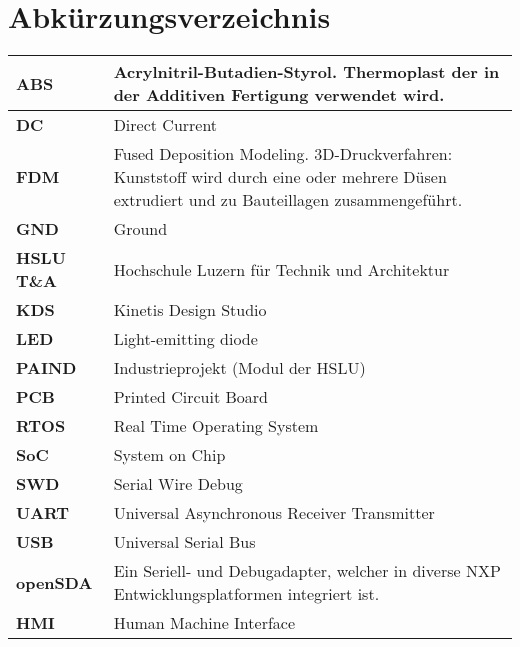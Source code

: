 \newpage
\section*{Abkürzungsverzeichnis}\label{dok:glossar}
\begin{table}[H]
	\begin{tabular}{|L{2.5cm}|L{13cm}|}

		\hline	
		\textbf{ABS} & Acrylnitril-Butadien-Styrol. Thermoplast der in der Additiven Fertigung verwendet wird.\\
		
		\hline	
		\textbf{DC} & Direct Current\\

		\hline
		\textbf{FDM} & Fused Deposition Modeling. 3D-Druckverfahren: Kunststoff wird durch eine oder mehrere Düsen extrudiert und zu Bauteillagen zusammengeführt.\\
		
		\hline
		\textbf{GND} & Ground\\
		
		\hline
		\textbf{HSLU T\&A} & Hochschule Luzern für Technik und Architektur\\ 
		
		\hline
		\textbf{KDS} & Kinetis Design Studio\\

		\hline
		\textbf{LED} & Light-emitting diode\\
		
	 	\hline
	 	\textbf{PAIND} &  Industrieprojekt (Modul der HSLU) \\ 
	 	
	 	\hline
	 	\textbf{PCB} &	Printed Circuit Board\\
				
		\hline
		\textbf{RTOS} & Real Time Operating System \\
		
		\hline
		\textbf{SoC} &	System on Chip\\
		
		\hline
		\textbf{SWD} &	Serial Wire Debug\\
		
		\hline
		\textbf{UART} &	Universal Asynchronous Receiver Transmitter\\
		
		\hline
		\textbf{USB} &	Universal Serial Bus\\		
		
		\hline
		\textbf{openSDA} & Ein Seriell- und Debugadapter, welcher in diverse NXP Entwicklungsplatformen integriert ist.\\
		
		\hline
		\textbf{HMI} & Human Machine Interface\\
				
		\hline
	\end{tabular} 
	\vspace{0.2cm}
\end{table}



